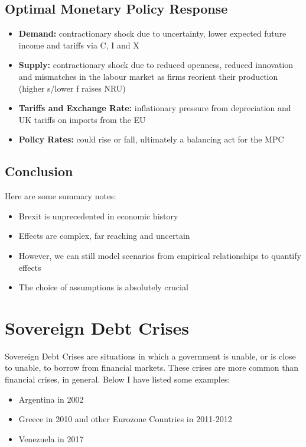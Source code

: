 \documentclass[12pt, letterpaper]{article}
\begin{document}
\subsection{Optimal Monetary Policy Response}
\begin{itemize}
	\item \textbf{Demand:} contractionary shock due to uncertainty, lower expected future income and tariffs via C, I and X
	\item \textbf{Supply:} contractionary shock due to reduced openness, reduced innovation and mismatches in the labour market as firms reorient their production (higher s/lower f raises NRU)
	\item \textbf{Tariffs and Exchange Rate:} inflationary pressure from depreciation and UK tariffs on imports from the EU
	\item \textbf{Policy Rates:} could rise or fall, ultimately a balancing act for the MPC
\end{itemize}

\subsection{Conclusion}
Here are some summary notes:
\begin{itemize}
	\item Brexit is unprecedented in economic history
	\item Effects are complex, far reaching and uncertain
	\item However, we can still model scenarios from empirical relationships to quantify effects
	\item The choice of assumptions is absolutely crucial
\end{itemize}



\newpage
\section{Sovereign Debt Crises}
Sovereign Debt Crises are situations in which a government is unable, or is close to unable, to borrow from financial markets. These crises are more common than financial crises, in general. Below I have listed some examples:
\begin{itemize}
	\item Argentina in 2002
	\item Greece in 2010 and other Eurozone Countries in 2011-2012
	\item Venezuela in 2017
\end{itemize}
\end{document}
